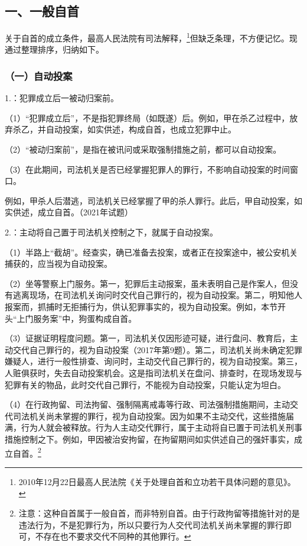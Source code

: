 \subsection*{一、一般自首}

关于自首的成立条件，最高人民法院有司法解释，\footnote{2010年12月22日最高人民法院《关于处理自首和立功若干具体问题的意见》。}但缺乏条理，不方便记忆。现通过整理排序，归纳如下。

\subsubsection*{（一）自动投案}

1.：犯罪成立后一被动归案前。

（1）“犯罪成立后”，不是指犯罪终局（如既遂）后。例如，甲在杀乙过程中，放弃杀乙，并自动投案，如实供述，构成自首，也成立犯罪中止。

（2）“被动归案前”，是指在被讯问或采取强制措施之前，都可以自动投案。

（3）在此期间，司法机关是否已经掌握犯罪人的罪行，不影响自动投案的时间窗口。

例如，甲杀人后潜逃，司法机关已经掌握了甲的杀人罪行。此后，甲自动投案，如实供述，成立自首。（2021年试题）

2.：主动将自己置于司法机关控制之下，就属于自动投案。

（1）半路上“截胡”。经查实，确已准备去投案，或者正在投案途中，被公安机关捕获的，应当视为自动投案。

（2）坐等警察上门服务。第一，犯罪后主动报案，虽未表明自己是作案人，但没有逃离现场，在司法机关询问时交代自己罪行的，视为自动投案。第二，明知他人报案而，抓捕时无拒捕行为，供认犯罪事实的，视为自动投案。例如，本节开头“上门服务案”中，狗蛋构成自首。

（3）证据证明程度问题。第一，司法机关仅因形迹可疑，进行盘问、教育后，主动交代自己罪行的，视为自动投案（2017年第9题）。第二，司法机关尚未确定犯罪嫌疑人，进行一般性排查、询问时，主动交代自己罪行的，视为自动投案。第三，人赃俱获时，失去自动投案机会。这是指司法机关在盘问、排查时，在现场发现与犯罪有关的物品，此时交代自己罪行，不能视为自动投案，只能认定为坦白。

（4）在行政拘留、司法拘留、强制隔离戒毒等行政、司法强制措施期间，主动交代司法机关尚未掌握的罪行，视为自动投案。因为如果不主动交代，这些措施届满，行为人就会被释放。行为人主动交代罪行，属于主动将自已置于司法机关刑事措施控制之下。例如，甲因被治安拘留，在拘留期间如实供述自己的强奸事实，成立自首。\footnote{注意：这种自首属于一般自首，而非特别自首。由于行政拘留等措施针对的是违法行为，不是犯罪行为，所以只要行为人交代司法机关尚未掌握的罪行即可，不存在也不要求交代不同种的其他罪行。}

